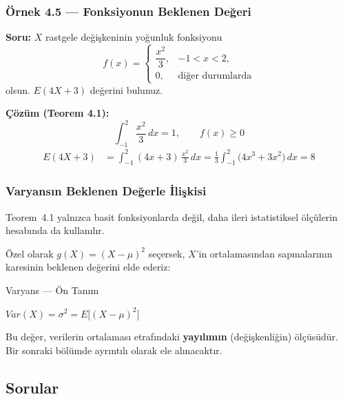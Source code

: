 ﻿\documentclass[light]{lutbeamer}
\begin{document}
\begin{frame}[fragile]
  \frametitle[Örnek 4.5]{Örnek 4.5 --- Fonksiyonun Beklenen Değeri}

  \smallskip
  \textbf{Soru:} $X$ rastgele değişkeninin yoğunluk fonksiyonu
  \[
    f(x)=
    \begin{cases}
      \dfrac{x^2}{3}, & -1<x<2,\\[2pt]
      0, & \text{diğer durumlarda}
    \end{cases}
  \]
  olsun. $E(4X+3)$ değerini bulunuz.

  \medskip
  \textbf{Çözüm (Teorem 4.1):}
  \[
    \int_{-1}^{2}\frac{x^2}{3}\,dx = 1,\qquad f(x)\ge 0
  \]
  \begin{align*}
    E(4X+3) &= \int_{-1}^{2} (4x+3)\,\frac{x^2}{3}\,dx = \frac{1}{3}\int_{-1}^{2}\bigl(4x^3 + 3x^2\bigr)\,dx = 8
  \end{align*}
\end{frame}


\begin{frame}[fragile]
  \frametitle{Varyansın Beklenen Değerle İlişkisi}
  Teorem~4.1 yalnızca basit fonksiyonlarda değil, daha ileri istatistiksel ölçülerin hesabında da kullanılır.

  \medskip
  Özel olarak $g(X) = (X - \mu)^2$ seçersek, $X$'in ortalamasından sapmalarının karesinin beklenen değerini elde ederiz:
  \begin{center}
    \begin{minipage}{0.7\textwidth}
      \begin{block}{Varyans --- Ön Tanım}
        \begin{center}
          $Var(X) = \sigma^2 = E\bigl[(X-\mu)^2\bigr]$
        \end{center}
      \end{block}
    \end{minipage}
  \end{center}
  Bu değer, verilerin ortalaması etrafındaki \textbf{yayılımın} (değişkenliğin) ölçüsüdür. Bir sonraki bölümde ayrıntılı olarak ele alınacaktır.
\end{frame}

\subsection{Sorular}
\end{document}
